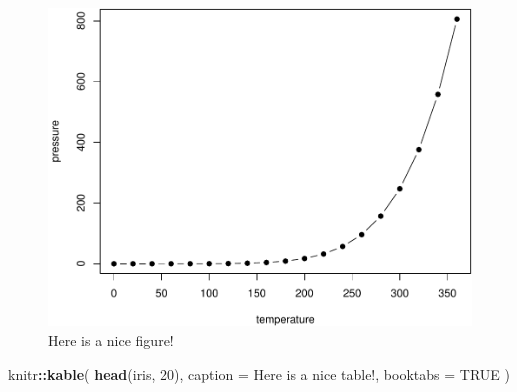 \documentclass[
]{book}
\newenvironment{Shaded}{\begin{snugshade}}{\end{snugshade}}
\newcommand{\AttributeTok}[1]{\textcolor[rgb]{0.13,0.29,0.53}{#1}}
\newcommand{\ConstantTok}[1]{\textcolor[rgb]{0.56,0.35,0.01}{#1}}
\newcommand{\DecValTok}[1]{\textcolor[rgb]{0.00,0.00,0.81}{#1}}
\newcommand{\FunctionTok}[1]{\textcolor[rgb]{0.13,0.29,0.53}{\textbf{#1}}}
\newcommand{\NormalTok}[1]{#1}
\newcommand{\SpecialCharTok}[1]{\textcolor[rgb]{0.81,0.36,0.00}{\textbf{#1}}}
\newcommand{\StringTok}[1]{\textcolor[rgb]{0.31,0.60,0.02}{#1}}
\begin{document}
\begin{figure}

{\centering \includegraphics[width=0.8\linewidth]{bookdown-demo_files/figure-latex/nice-fig-1} 

}

\caption{Here is a nice figure!}\label{fig:nice-fig}
\end{figure}

\begin{Shaded}
\begin{Highlighting}[]
\NormalTok{knitr}\SpecialCharTok{::}\FunctionTok{kable}\NormalTok{(}
  \FunctionTok{head}\NormalTok{(iris, }\DecValTok{20}\NormalTok{), }\AttributeTok{caption =} \StringTok{\textquotesingle{}Here is a nice table!\textquotesingle{}}\NormalTok{,}
  \AttributeTok{booktabs =} \ConstantTok{TRUE}
\NormalTok{)}
\end{Highlighting}
\end{Shaded}
\end{document}
